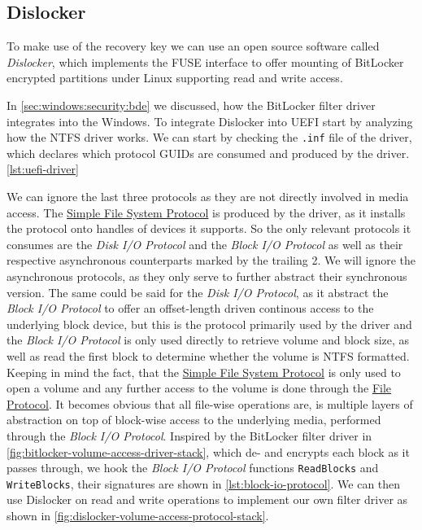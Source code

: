 \subsection{Dislocker}

To make use of the recovery key we can use an open source software called \emph{Dislocker}, which implements the \ac{FUSE} interface to offer mounting of BitLocker encrypted partitions under Linux supporting read and write access\cite{dislocker}.

In \autoref{sec:windows:security:bde} we discussed, how the BitLocker filter driver integrates into the Windows.
To integrate Dislocker into \ac{UEFI} start by analyzing how the \ac{NTFS} driver works.
We can start by checking the \lstinline{.inf} file of the driver, which declares which protocol \acp{GUID} are consumed and produced by the driver. \autoref{lst:uefi-driver}



We can ignore the last three protocols as they are not directly involved in media access.
The \hyperref[lst:simple-file-system-protocol]{Simple File System Protocol} is produced by the driver, as it installs the protocol onto handles of devices it supports.
So the only relevant protocols it consumes are the \emph{Disk \ac{I/O} Protocol} and the \emph{Block \ac{I/O} Protocol} as well as their respective asynchronous counterparts marked by the trailing 2.
We will ignore the asynchronous protocols, as they only serve to further abstract their synchronous version\cite[13.8 and 13.10]{uefi-spec}.
The same could be said for the \emph{Disk \ac{I/O} Protocol}, as it abstract the \emph{Block \ac{I/O} Protocol} to offer an offset-length driven continous access to the underlying block device\cite[13.7]{uefi-spec}, but this is the protocol primarily used by the driver and the \emph{Block \ac{I/O} Protocol} is only used directly to retrieve volume and block size, as well as read the first block to determine whether the volume is \ac{NTFS} formatted.
Keeping in mind the fact, that the \hyperref[lst:simple-file-system-protocol]{Simple File System Protocol} is only used to open a volume and any further access to the volume is done through the \hyperref[lst:simple-file-system-protocol]{File Protocol}.
It becomes obvious that all file-wise operations are, is multiple layers of abstraction on top of block-wise access to the underlying media, performed through the \emph{Block \ac{I/O} Protocol}.
Inspired by the BitLocker filter driver in \autoref{fig:bitlocker-volume-access-driver-stack}, which de- and encrypts each block as it passes through, we hook the \emph{Block \ac{I/O} Protocol} functions \lstinline{ReadBlocks} and \lstinline{WriteBlocks}, their signatures are shown in \autoref{lst:block-io-protocol}.
We can then use Dislocker on read and write operations to implement our own filter driver as shown in \autoref{fig:dislocker-volume-access-protocol-stack}.


